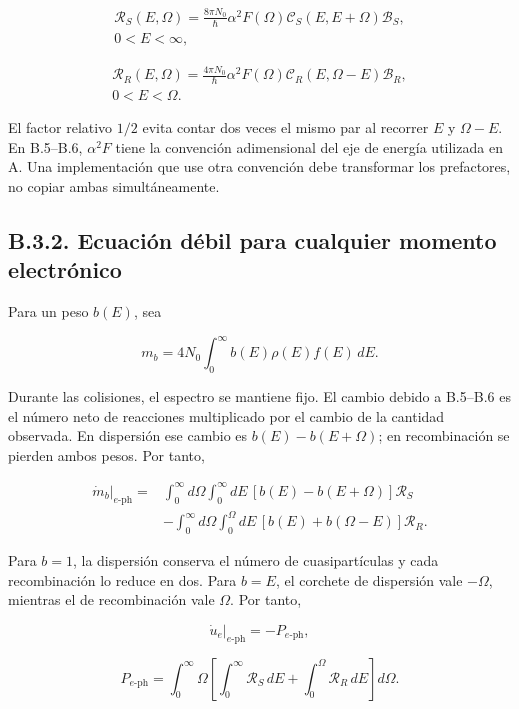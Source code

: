 \documentclass[
  spanish,
  10pt,
  a4paper,
]{article}
\begin{document}
\[
\begin{gathered}
\mathcal R_S(E,\Omega)=\frac{8\pi N_0}{\hbar}
\alpha^2F(\Omega)\mathcal C_S(E,E+\Omega)\mathcal B_S,\\
0<E<\infty,
\end{gathered} \tag{B.5}
\]

\[
\begin{gathered}
\mathcal R_R(E,\Omega)=\frac{4\pi N_0}{\hbar}
\alpha^2F(\Omega)\mathcal C_R(E,\Omega-E)\mathcal B_R,\\
0<E<\Omega.
\end{gathered} \tag{B.6}
\]

El factor relativo \(1/2\) evita contar dos veces el mismo par al
recorrer \(E\) y \(\Omega-E\). En B.5--B.6, \(\alpha^2F\) tiene la
convención adimensional del eje de energía utilizada en A. Una
implementación que use otra convención debe transformar los prefactores,
no copiar ambas simultáneamente.

\subsection{B.3.2. Ecuación débil para cualquier momento
electrónico}\label{b.3.2.-ecuaciuxf3n-duxe9bil-para-cualquier-momento-electruxf3nico}

Para un peso \(b(E)\), sea

\[
m_b=4N_0\int_0^\infty b(E)\rho(E)f(E)\,dE.
\]

Durante las colisiones, el espectro se mantiene fijo. El cambio debido a
B.5--B.6 es el número neto de reacciones multiplicado por el cambio de
la cantidad observada. En dispersión ese cambio es \(b(E)-b(E+\Omega)\);
en recombinación se pierden ambos pesos. Por tanto,

\[
\begin{aligned}
\left.\dot m_b\right|_{e\text{-ph}}={}&
\int_0^\infty d\Omega\int_0^\infty dE\,
[b(E)-b(E+\Omega)]\mathcal R_S\\
&-\int_0^\infty d\Omega\int_0^\Omega dE\,
[b(E)+b(\Omega-E)]\mathcal R_R.
\end{aligned} \tag{B.7}
\]

Para \(b=1\), la dispersión conserva el número de cuasipartículas y cada
recombinación lo reduce en dos. Para \(b=E\), el corchete de dispersión
vale \(-\Omega\), mientras el de recombinación vale \(\Omega\). Por
tanto,

\[
\left.\dot u_e\right|_{e\text{-ph}}=-P_{e\text{-ph}}, \tag{B.8}
\]

\[
P_{e\text{-ph}}=\int_0^\infty\Omega\left[
\int_0^\infty\mathcal R_S\,dE+
\int_0^\Omega\mathcal R_R\,dE\right]d\Omega. \tag{B.9}
\]
\end{document}
